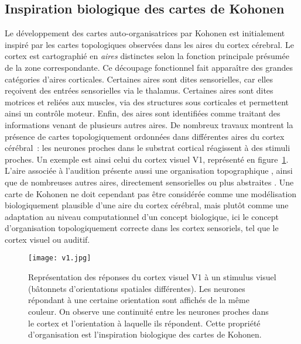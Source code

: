 \documentclass[../main]{subfiles}
\begin{document}
\subsection{Inspiration biologique des cartes de Kohonen}
Le développement des cartes auto-organisatrices par Kohonen est initialement inspiré par les cartes topologiques observées dans les aires du cortex cérebral. 
Le cortex est cartographié en \emph{aires} distinctes selon la fonction principale présumée de la zone correspondante.
Ce découpage fonctionnel fait apparaître des grandes catégories d'aires corticales. 
Certaines aires sont dites sensorielles, car elles reçoivent des entrées sensorielles via le thalamus. Certaines aires sont dites motrices et reliées aux muscles, via des structures sous corticales et permettent ainsi un contrôle moteur.
Enfin, des aires sont identifiées comme traitant des informations venant de plusieurs autres aires.
De nombreux travaux montrent la présence de cartes topologiquement ordonnées dans différentes aires du cortex cérébral~: les neurones proches dans le substrat cortical réagissent à des stimuli proches. 
Un exemple est ainsi celui du cortex visuel V1, représenté en figure~\ref{fig:v1}. 
L'aire associée à l'audition présente aussi une organisation topographique \cite{Reale1980TonotopicOI}, ainsi que de nombreuses autres aires, directement sensorielles ou plus abstraites \cite{Kohonen1995SelfOrganizingM}. 
Une carte de Kohonen ne doit cependant pas être considérée comme une modélisation biologiquement plausible d'une aire du cortex cérébral, mais plutôt comme une adaptation au niveau computationnel d'un concept biologique, ici le concept d'organisation topologiquement correcte dans les cortex sensoriels, tel que le cortex visuel ou auditif.

\begin{figure}
\centering
\texttt{[image: v1.jpg]}
\caption{Représentation des réponses du cortex visuel V1 à un stimulus visuel (bâtonnets d'orientations spatiales différentes). Les neurones répondant à une certaine orientation sont affichés de la même couleur. On observe une continuité entre les neurones proches dans le cortex et l'orientation à laquelle ils répondent. Cette propriété d'organisation est l'inspiration biologique des cartes de Kohonen.}
\label{fig:v1}
\end{figure}
\end{document}
